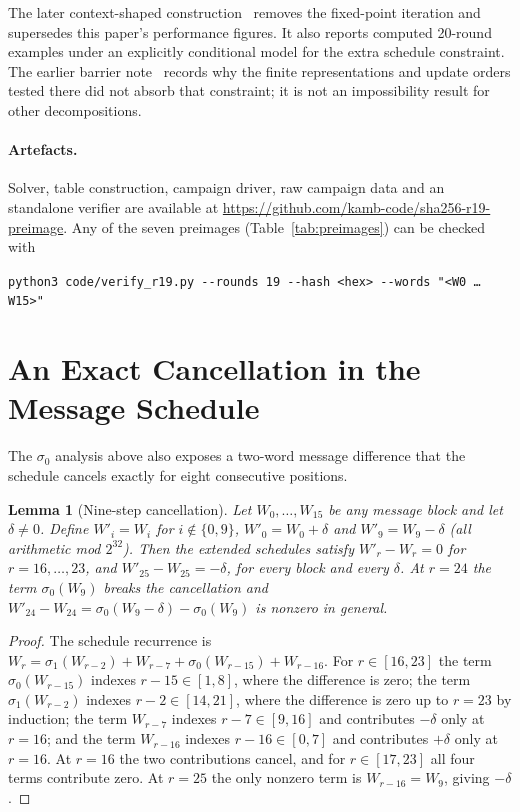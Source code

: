 \documentclass[11pt,a4paper]{article}
\newtheorem{lemma}{Lemma}
\newcommand{\sig}[1]{\sigma_{#1}}
\begin{document}
The later context-shaped construction~\cite{Basra2026Submask} removes the
fixed-point iteration and supersedes this paper's performance figures.  It
also reports computed 20-round examples under an explicitly conditional
model for the extra schedule constraint.  The earlier barrier
note~\cite{Basra2026R20} records why the finite representations and update
orders tested there did not absorb that constraint; it is not an
impossibility result for other decompositions.

\paragraph{Artefacts.}
Solver, table construction, campaign driver, raw campaign data and an
standalone verifier are available at
\url{https://github.com/kamb-code/sha256-r19-preimage}.
Any of the seven preimages (Table~\ref{tab:preimages}) can be checked with
\begin{center}
\small\texttt{python3 code/verify\_r19.py {-}{-}rounds 19 {-}{-}hash <hex> {-}{-}words "<W0 \ldots W15>"}
\end{center}

\appendix
\section{An Exact Cancellation in the Message Schedule}
\label{app:ninestep}

The $\sigma_0$ analysis above also exposes a two-word message difference
that the schedule cancels exactly for eight consecutive positions.

\begin{lemma}[Nine-step cancellation]
\label{lem:nine-step}
Let $W_0,\ldots,W_{15}$ be any message block and let $\delta\ne0$.  Define
$W'_i = W_i$ for $i\notin\{0,9\}$, $W'_0 = W_0+\delta$ and
$W'_9 = W_9-\delta$ (all arithmetic mod $2^{32}$).  Then the extended
schedules satisfy $W'_r - W_r = 0$ for $r = 16,\ldots,23$, and $W'_{25} - W_{25} = -\delta$, for every block and every $\delta$.  At $r=24$ the term $\sig{0}(W_9)$ breaks the cancellation and $W'_{24}-W_{24} = \sig{0}(W_9-\delta)-\sig{0}(W_9)$ is nonzero in general.
\end{lemma}

\begin{proof}
The schedule recurrence is
$W_r = \sigma_1(W_{r-2}) + W_{r-7} + \sigma_0(W_{r-15}) + W_{r-16}$.
For $r\in[16,23]$ the term $\sigma_0(W_{r-15})$ indexes $r-15\in[1,8]$,
where the difference is zero; the term $\sigma_1(W_{r-2})$ indexes
$r-2\in[14,21]$, where the difference is zero up to $r=23$ by induction;
the term $W_{r-7}$ indexes $r-7\in[9,16]$ and contributes $-\delta$ only
at $r=16$; and the term $W_{r-16}$ indexes $r-16\in[0,7]$ and contributes
$+\delta$ only at $r=16$.  At $r=16$ the two contributions cancel, and for
$r\in[17,23]$ all four terms contribute zero.  At $r=25$ the only nonzero
term is $W_{r-16}=W_9$, giving $-\delta$.
\end{proof}
\end{document}
